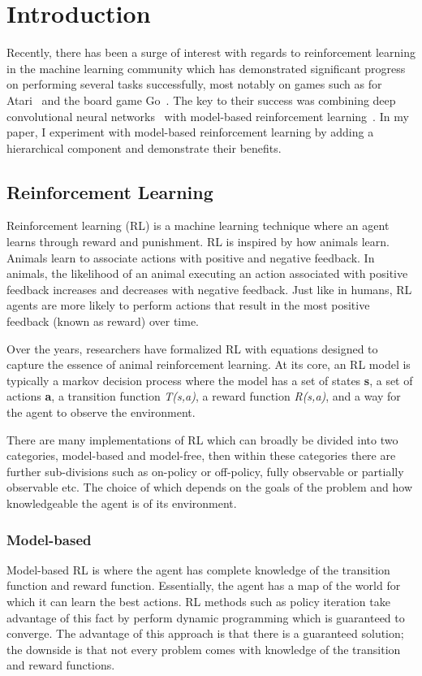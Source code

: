 \section{Introduction}
Recently, there has been a surge of interest with regards to reinforcement learning in the machine learning community which has demonstrated significant progress on performing several tasks successfully, most notably on games such as for Atari~\cite{mnih2015human} and the board game Go~\cite{silver2016mastering}. The key to their success was combining deep convolutional neural networks~\cite{krizhevsky2012imagenet} with model-based reinforcement learning~\cite{sutton1998reinforcement}. In my paper, I experiment with model-based reinforcement learning by adding a hierarchical component and demonstrate their benefits.

\subsection{Reinforcement Learning}
Reinforcement learning (RL) is a machine learning technique where an agent learns through reward and punishment. RL is inspired by how animals learn. Animals learn to associate actions with positive and negative feedback. In animals, the likelihood of an animal executing an action associated with positive feedback increases and decreases with negative feedback. Just like in humans, RL agents are more likely to perform actions that result in the most positive feedback (known as reward) over time. 

Over the years, researchers have formalized RL with equations designed to capture the essence of animal reinforcement learning. At its core, an RL model is typically a markov decision process where the model has a set of states \textbf{s}, a set of actions \textbf{a}, a transition function \textit{T(s,a)}, a reward function \textit{R(s,a)}, and a way for the agent to observe the environment.

There are many implementations of RL which can broadly be divided into two categories, model-based and model-free, then within these categories there are further sub-divisions such as on-policy or off-policy, fully observable or partially observable etc. The choice of which depends on the goals of the problem and how knowledgeable the agent is of its environment.

\subsubsection{Model-based}
Model-based RL is where the agent has complete knowledge of the transition function and reward function. Essentially, the agent has a map of the world for which it can learn the best actions. RL methods such as policy iteration take advantage of this fact by perform dynamic programming which is guaranteed to converge. The advantage of this approach is that there is a guaranteed solution; the downside is that not every problem comes with knowledge of the transition and reward functions.

